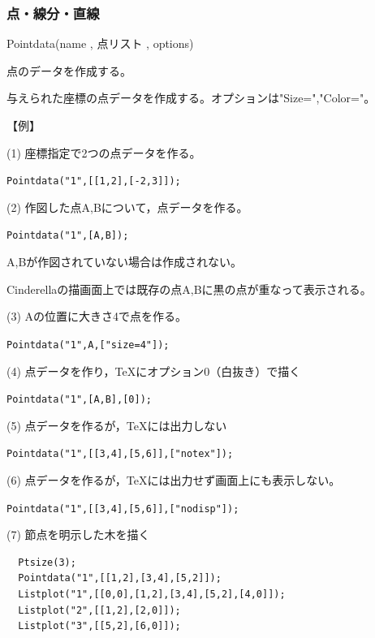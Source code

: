 \documentclass[papersize,a4paper,12pt,uplatex]{jsarticle}
\begin{document}
\subsubsection{点・線分・直線}
\begin{description}

\vspace{\baselineskip}
\hypertarget{pointdata}{}
\item[関数]  Pointdata(name , 点リスト , options)
\item[機能]  点のデータを作成する。
\item[説明]  与えられた座標の点データを作成する。オプションは"Size=","Color="。

\vspace{\baselineskip}
【例】

(1) 座標指定で2つの点データを作る。

\hspace{10mm} \verb|Pointdata("1",[[1,2],[-2,3]]);|

(2) 作図した点A,Bについて，点データを作る。

\hspace{10mm} \verb|Pointdata("1",[A,B]);|
      
\hspace{5mm}A,Bが作図されていない場合は作成されない。

\hspace{5mm}Cinderellaの描画面上では既存の点A,Bに黒の点が重なって表示される。

(3) Aの位置に大きさ4で点を作る。

\hspace{10mm} \verb|Pointdata("1",A,["size=4"]);|
      
(4) 点データを作り，TeXにオプション0（白抜き）で描く

\hspace{10mm}  \verb|Pointdata("1",[A,B],[0]);|
      
(5) 点データを作るが，TeXには出力しない

\hspace{10mm}  \verb|Pointdata("1",[[3,4],[5,6]],["notex"]);|

(6)  点データを作るが，TeXには出力せず画面上にも表示しない。
        
\hspace{10mm} \verb|Pointdata("1",[[3,4],[5,6]],["nodisp"]);|

(7) 節点を明示した木を描く
\begin{verbatim}
  Ptsize(3); 
  Pointdata("1",[[1,2],[3,4],[5,2]]); 
  Listplot("1",[[0,0],[1,2],[3,4],[5,2],[4,0]]); 
  Listplot("2",[[1,2],[2,0]]); 
  Listplot("3",[[5,2],[6,0]]);
\end{verbatim}
 

\end{description}
\end{document}
